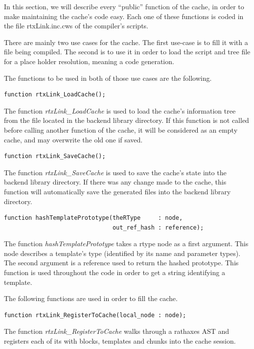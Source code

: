 \documentclass[american]{rtxreport}
\begin{document}
\begin{enumerate}
In this section, we will describe every ``public'' function of the cache, in
order to make maintaining the cache's code easy. Each one of these functions is
coded in the file rtxLink.inc.cws of the compiler's scripts.

There are mainly two use cases for the cache. The first use-case is to fill it
with a file being compiled. The second is to use it in order to load the script
and tree file for a place holder resolution, meaning a code generation.

\vspace{}

The functions to be used in both of those use cases are the following.

\begin{lstlisting}
function rtxLink_LoadCache();
\end{lstlisting}
The function \emph{rtxLink\_LoadCache} is used to load the cache's information
tree from the file located in the backend library directory. If this function
is not called before calling another function of the cache, it will be
considered as an empty cache, and may overwrite the old one if saved.

\begin{lstlisting}
function rtxLink_SaveCache();
\end{lstlisting}
The function \emph{rtxLink\_SaveCache} is used to save the cache's state into
the backend library directory. If there was any change made to the cache, this
function will automatically save the generated files into the backend library
directory.

\begin{lstlisting}
function hashTemplatePrototype(theRType     : node,
                               out_ref_hash : reference);
\end{lstlisting}
The function \emph{hashTemplatePrototype} takes a rtype node as a first
argument.  This node describes a template's type (identified by its name and
parameter types). The second argument is a reference used to return the hashed
prototype.  This function is used throughout the code in order to get a string
identifying a template.

\vspace{}

The following functions are used in order to fill the cache.

\begin{lstlisting}
function rtxLink_RegisterToCache(local_node : node);
\end{lstlisting}
The function \emph{rtxLink\_RegisterToCache} walks through a rathaxes AST and
registers each of its with blocks, templates and chunks into the cache session.


\end{enumerate}
\end{document}
